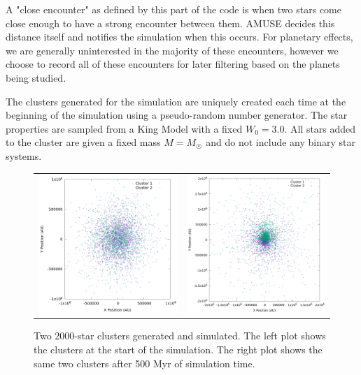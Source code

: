 \documentclass[12pt]{article}
\begin{document}
    A "close encounter" as defined by this part of the code is when two stars
    come close enough to have a strong encounter between them. AMUSE decides
    this distance itself and notifies the simulation when this occurs. For planetary
    effects, we are generally uninterested in the majority of these encounters, however
    we choose to record all of these encounters for later filtering based on the
    planets being studied.

    The clusters generated for the simulation are uniquely created each time at the
    beginning of the simulation using a pseudo-random number generator. 
    The star properties are sampled from a
    King Model with a fixed $W_0=3.0$. %
    All stars added to the cluster are given a fixed mass $M=M_{\astrosun}$ and do not
    include any binary star systems.     

    \begin{figure}[H]
        \centering
        \caption{Two 2000-star clusters generated and simulated. The left plot
            shows the clusters at the start of the simulation. The right plot shows
            the same two clusters after 500 Myr of simulation time.}
        \begin{tabular}{cc}
            \includegraphics[width=3.0in]{clusters_superimposed_n_2000} &
            \includegraphics[width=3.0in]{clusters_superimposed_final_n_2000}
        \end{tabular}
    \end{figure}
\end{document}
